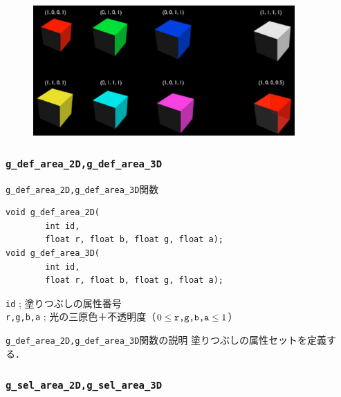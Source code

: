 \documentclass[platex,a4paper,12pt]{jsarticle}%
\begin{document}
\begin{figure}[htb]
	\includegraphics[width=100mm]{./Figures/eps/Canvas_g_area_color.eps}
\end{figure}

\clearpage
\subsubsection{\texttt{g\_def\_area\_2D,g\_def\_area\_3D}}

\begin{itembox}[l]{\texttt{g\_def\_area\_2D,g\_def\_area\_3D}関数}
\begin{verbatim}
void g_def_area_2D(
        int id,	
        float r, float b, float g, float a);
void g_def_area_3D(
        int id,	
        float r, float b, float g, float a);
\end{verbatim}
\verb|id| ; 塗りつぶしの属性番号\\
\verb|r,g,b,a| ; 光の三原色＋不透明度（$0\leq \verb|r,g,b,a| \leq 1$）\\
\end{itembox}

\begin{itembox}[l]{\texttt{g\_def\_area\_2D,g\_def\_area\_3D}関数の説明}
塗りつぶしの属性セットを定義する．
\end{itembox}

\subsubsection{\texttt{g\_sel\_area\_2D,g\_sel\_area\_3D}}
\end{document}
